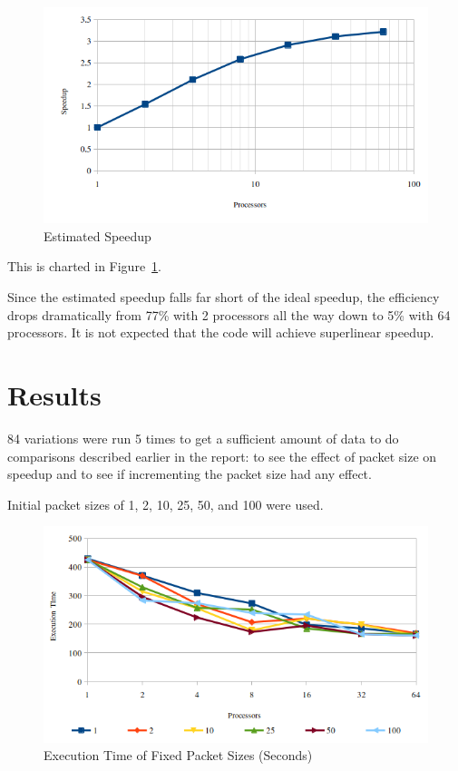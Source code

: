 \documentclass{article}
\begin{document}
  \begin{figure}[t]
    \caption{Estimated Speedup}
    \label{fig:estspeedup}
    \centering

    \includegraphics[scale=0.5]{estimatedspeedup}
  \end{figure}

  This is charted in Figure~\ref{fig:estspeedup}.

  Since the estimated speedup falls far short of the ideal speedup, the
  efficiency drops dramatically from 77\% with 2 processors all the way down
  to 5\% with 64 processors. It is not expected that the code will achieve
  superlinear speedup.

  \section{Results}

  84 variations were run 5 times to get a sufficient amount of data to do
  comparisons described earlier in the report: to see the effect of packet size
  on speedup and to see if incrementing the packet size had any effect.

  Initial packet sizes of 1, 2, 10, 25, 50, and 100 were used.

  \begin{figure}[H]
    \caption{Execution Time of Fixed Packet Sizes (Seconds)}
    \label{fig:fixedexectime}
    \centering

    \includegraphics[scale=0.5]{fixedexec}
  \end{figure}
\end{document}

